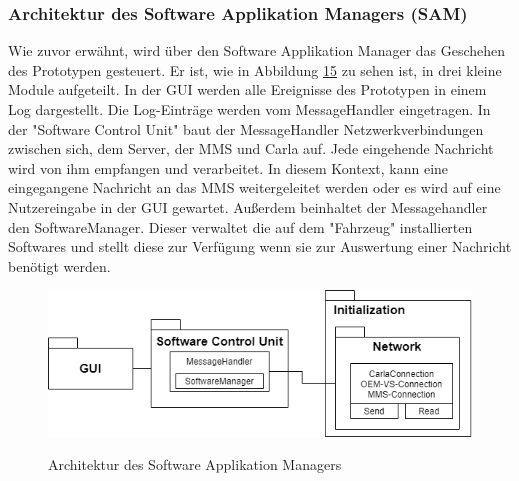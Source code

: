 \subsubsection{Architektur des Software Applikation Managers (SAM)}
Wie zuvor erwähnt, wird über den Software Applikation Manager das Geschehen des Prototypen gesteuert. Er ist, wie in Abbildung \hyperref[img:sam]{15} zu sehen ist, in drei kleine Module aufgeteilt. In der GUI werden alle Ereignisse des Prototypen in einem Log dargestellt. Die Log-Einträge werden vom MessageHandler eingetragen. In der "Software Control Unit" baut der MessageHandler Netzwerkverbindungen zwischen sich, dem Server, der MMS und Carla auf. Jede eingehende Nachricht wird von ihm empfangen und verarbeitet. In diesem Kontext, kann eine eingegangene Nachricht an das MMS weitergeleitet werden oder es wird auf eine Nutzereingabe in der GUI gewartet. Außerdem beinhaltet der Messagehandler den SoftwareManager. Dieser verwaltet die auf dem "Fahrzeug" installierten Softwares und stellt diese zur Verfügung wenn sie zur Auswertung einer Nachricht benötigt werden.
\begin{figure}[!h]
	\centering
	\includegraphics[width=0.8\columnwidth]{pictures/konzept-SAM.png}
	\label{img:sam}
	\caption{Architektur des Software Applikation Managers}
\end{figure}

